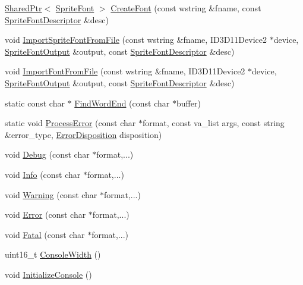 \begin{DoxyCompactItemize}
\item 
\hyperlink{namespacemage_a1e01ae66713838a7a67d30e44c67703e}{Shared\+Ptr}$<$ \hyperlink{classmage_1_1_sprite_font}{Sprite\+Font} $>$ \hyperlink{namespacemage_ac93dae3a8755fa1e1c9be6c8aa0e07d2}{Create\+Font} (const wstring \&fname, const \hyperlink{structmage_1_1_sprite_font_descriptor}{Sprite\+Font\+Descriptor} \&desc)
\item 
void \hyperlink{namespacemage_aac88563417bcd178423aec61ca687a74}{Import\+Sprite\+Font\+From\+File} (const wstring \&fname, I\+D3\+D11\+Device2 $\ast$device, \hyperlink{structmage_1_1_sprite_font_output}{Sprite\+Font\+Output} \&output, const \hyperlink{structmage_1_1_sprite_font_descriptor}{Sprite\+Font\+Descriptor} \&desc)
\item 
void \hyperlink{namespacemage_a23fecd103cda79e7c9fd5cf372ae5e9f}{Import\+Font\+From\+File} (const wstring \&fname, I\+D3\+D11\+Device2 $\ast$device, \hyperlink{structmage_1_1_sprite_font_output}{Sprite\+Font\+Output} \&output, const \hyperlink{structmage_1_1_sprite_font_descriptor}{Sprite\+Font\+Descriptor} \&desc)
\item 
static const char $\ast$ \hyperlink{namespacemage_a81ebde51f9da00dd6fad364a2c5017cb}{Find\+Word\+End} (const char $\ast$buffer)
\item 
static void \hyperlink{namespacemage_ab248f74af47acacc1306e875fb19a9ce}{Process\+Error} (const char $\ast$format, const va\+\_\+list args, const string \&error\+\_\+type, \hyperlink{namespacemage_a7146b3c3db53179eeb32bf4d51934715}{Error\+Disposition} disposition)
\item 
void \hyperlink{namespacemage_a1bcf1f0301e170105908eee5b5c46830}{Debug} (const char $\ast$format,...)
\item 
void \hyperlink{namespacemage_add6aa5f13960ce07b20f48d273956a91}{Info} (const char $\ast$format,...)
\item 
void \hyperlink{namespacemage_a0eccd8065c75d5f2bf86b48a5be3bfe5}{Warning} (const char $\ast$format,...)
\item 
void \hyperlink{namespacemage_a52a7fe8c9ce39afd9e0b0299373db0fa}{Error} (const char $\ast$format,...)
\item 
void \hyperlink{namespacemage_aefd40c91591a8e0423e4222b4a5e6249}{Fatal} (const char $\ast$format,...)
\item 
uint16\+\_\+t \hyperlink{namespacemage_a2988e0e46e373691a189ea97135f1ed1}{Console\+Width} ()
\item 
void \hyperlink{namespacemage_a587146c8cbeed655be16ddff8435c05c}{Initialize\+Console} ()

\end{DoxyCompactItemize}
